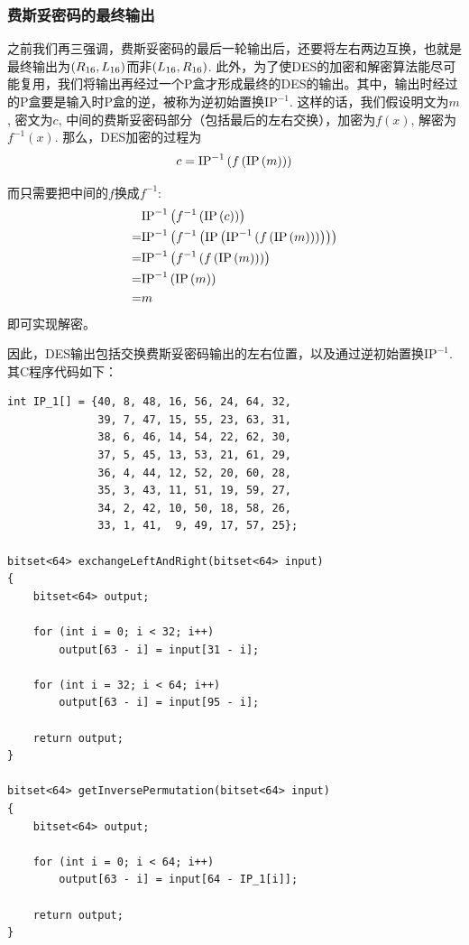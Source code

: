 \subsubsection{费斯妥密码的最终输出}
之前我们再三强调，费斯妥密码的最后一轮输出后，还要将左右两边互换，也就是最终输出为$\left( {R_{16}, L_{16}}\right)$而非$\left( {L_{16}, R_{16}}\right)$. 此外，为了使DES的加密和解密算法能尽可能复用，我们将输出再经过一个P盒才形成最终的DES的输出。其中，输出时经过的P盒要是输入时P盒的逆，被称为逆初始置换$\mathrm{IP}^{-1}$. 这样的话，我们假设明文为$m$, 密文为$c$, 中间的费斯妥密码部分（包括最后的左右交换），加密为$f(x)$, 解密为$f^{-1}(x)$. 那么，DES加密的过程为
\[c=\mathrm{IP}^{-1}\left( {f\left( {\mathrm{IP}\left( {m}\right)}\right)}\right)\]

而只需要把中间的$f$换成$f^{-1}$:
\begin{align*}
    &\mathrm{IP}^{-1}\left( {f^{-1}\left( {\mathrm{IP}\left( {c}\right)}\right)}\right)\\
    =&\mathrm{IP}^{-1}\left( {f^{-1}\left( {\mathrm{IP}\left( {\mathrm{IP}^{-1}\left( {f\left( {\mathrm{IP}\left( {m}\right)}\right)}\right)}\right)}\right)}\right)\\
    =&\mathrm{IP}^{-1}\left( {f^{-1}\left( {f\left( {\mathrm{IP}\left( {m}\right)}\right)}\right)}\right)\\
    =&\mathrm{IP}^{-1}\left( {\mathrm{IP}\left( {m}\right)}\right)\\
    =&m
\end{align*}
即可实现解密。\par
因此，DES输出包括交换费斯妥密码输出的左右位置，以及通过逆初始置换$\mathrm{IP}^{-1}$. 其C程序代码如下：
\begin{prove}
    \begin{verbatim}
int IP_1[] = {40, 8, 48, 16, 56, 24, 64, 32,
              39, 7, 47, 15, 55, 23, 63, 31,
              38, 6, 46, 14, 54, 22, 62, 30,
              37, 5, 45, 13, 53, 21, 61, 29,
              36, 4, 44, 12, 52, 20, 60, 28,
              35, 3, 43, 11, 51, 19, 59, 27,
              34, 2, 42, 10, 50, 18, 58, 26,
              33, 1, 41,  9, 49, 17, 57, 25};

bitset<64> exchangeLeftAndRight(bitset<64> input)
{
    bitset<64> output;

    for (int i = 0; i < 32; i++)
        output[63 - i] = input[31 - i];

    for (int i = 32; i < 64; i++)
        output[63 - i] = input[95 - i];

    return output;
}

bitset<64> getInversePermutation(bitset<64> input)
{
    bitset<64> output;

    for (int i = 0; i < 64; i++)
        output[63 - i] = input[64 - IP_1[i]];

    return output;
}
    \end{verbatim}
\end{prove}
